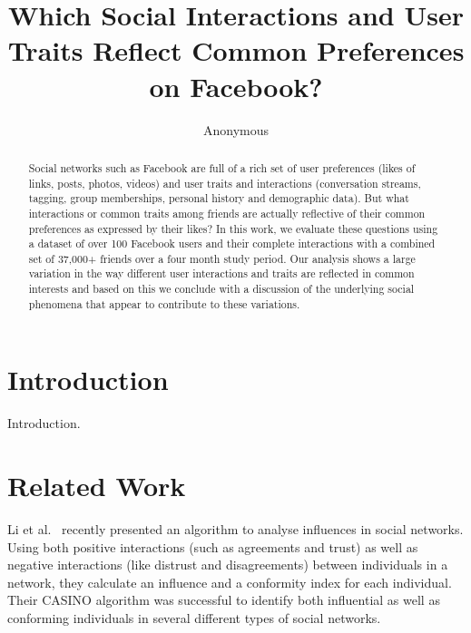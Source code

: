 \documentclass[letterpaper]{article}
\begin{document}
%
\title{Which Social Interactions and User Traits Reflect Common Preferences on Facebook?}
\author{Anonymous}
\maketitle
\begin{abstract}
Social networks such as Facebook are full of a rich set of user preferences (likes of links, posts, photos, videos) and user traits and interactions (conversation streams, tagging, group memberships, personal history and demographic data). But what interactions or common traits among friends are actually reflective of their common preferences as expressed by their likes? In this work, we evaluate these questions using a dataset of over 100 Facebook users and their complete interactions with a combined set of 37,000+ friends over a four month study period. Our analysis shows a large variation in the way different user interactions and traits are reflected in common interests and based on this we conclude with a discussion of the underlying social phenomena that appear to contribute to these variations.
\end{abstract}


\section{Introduction}


Introduction. \cite{influence}


\section{Related Work}




Li et al.~\cite{Li:2011:CTC:2063576.2063721} recently presented an
algorithm to analyse influences in social networks. Using both positive
interactions (such as agreements and trust) as well as negative
interactions (like distrust and disagreements) between individuals in
a network, they calculate an influence and a conformity index for each
individual. Their CASINO algorithm was successful to identify both
influential as well as conforming individuals in several
different types of social networks.
\end{document}
